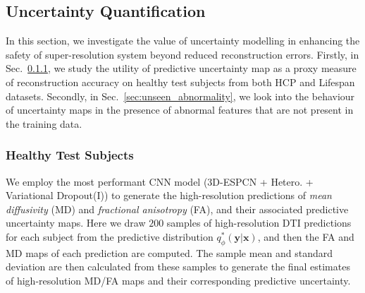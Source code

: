 \subsection{Uncertainty Quantification}
 In this section, we investigate the value of uncertainty modelling in enhancing the safety of super-resolution system beyond reduced reconstruction errors. Firstly, in Sec.~\ref{sec:uncertainty_HCP}, we study the utility of predictive uncertainty map as a proxy measure of reconstruction accuracy on healthy test subjects from both HCP and Lifespan datasets. Secondly, in Sec.~\ref{sec:unseen_abnormality}, we look into the behaviour of uncertainty maps in the presence of abnormal features that are not present in the training data. 



\subsubsection{Healthy Test Subjects} \label{sec:uncertainty_HCP}
We employ the most performant CNN model (3D-ESPCN + Hetero. + Variational Dropout(I)) to generate the high-resolution predictions of \textit{mean diffusivity} (MD) and \textit{fractional anisotropy} (FA), and their associated predictive uncertainty maps.  Here we draw $200$ samples of high-resolution DTI predictions for each subject from the predictive distribution $q_\phi^*(\mathbf{y}|\mathbf{x})$, and then the FA and MD maps of each prediction are computed. The sample mean and standard deviation are then calculated from these samples to generate the final estimates of high-resolution MD/FA maps and their corresponding predictive uncertainty. 

